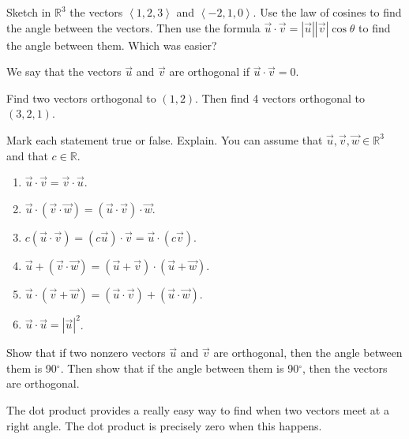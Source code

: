 \begin{problem}\label{dot angle practice}  
%
Sketch in $\mathbb{R}^3$ the vectors $\left<1,2,3\right>$ and $\left<-2,1,0\right>$.  Use the law of cosines to find the angle between the vectors. Then use the formula $\vec u\cdot \vec v=|\vec u||\vec v|\cos\theta$ to find the angle between them. Which was easier?
\end{problem}

\begin{definition}
We say that the vectors $\vec u$ and $\vec v$ are orthogonal if $\vec u\cdot \vec v=0$. 
\end{definition}

\begin{problem}
Find two vectors orthogonal to $(1,2)$.  Then find 4 vectors orthogonal to $(3,2,1)$.  
\end{problem}

\begin{problem}\label{dot product facts}
Mark each statement true or false. Explain. You can assume that $\vec u,\vec v,\vec w\in\mathbb{R}^3$ and that $c\in\mathbb{R}$.
\begin{enumerate}
\item $\vec u\cdot \vec v=\vec v\cdot \vec u$. 
\item $\vec u\cdot (\vec v\cdot \vec w)=(\vec u\cdot\vec v)\cdot\vec w$. 
\item $c(\vec u\cdot \vec v)=(c\vec u)\cdot \vec v=\vec u\cdot (c\vec v)$. 
\item $\vec u+(\vec v\cdot \vec w)=(\vec u+\vec v)\cdot(\vec u+\vec w)$. 
\item $\vec u\cdot (\vec v+ \vec w)=(\vec u\cdot \vec v)+(\vec u\cdot\vec w)$. 
\item $\vec u\cdot \vec u= |\vec u|^2$. 
\end{enumerate}
\end{problem}

\begin{problem} 
%
Show that if two nonzero vectors $\vec u$ and $\vec v$ are orthogonal, then the angle between them is 90$^\circ$. Then show that if the angle between them is 90$^\circ$, then the vectors are orthogonal.
\end{problem}
The dot product provides a really easy way to find when two vectors meet at a right angle. The dot product is precisely zero when this happens.

